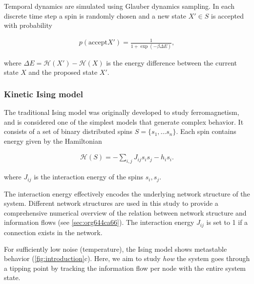 \documentclass[a4paper, 11pt, twocolumn]{article}
\begin{document}
Temporal  dynamics  are  simulated  using  Glauber  dynamics
sampling.  In each  discrete time  step a  spin is  randomly
chosen  and  a   new  state  \(X'\in  S\)   is  accepted  with
probability

\begin{equation}
\label{eq:glauber}
\begin{split}
 p(  \text{accept} X'  ) =  \frac{1}{1 +
\exp(-\beta   \Delta  E)},
\end{split}
\end{equation}

where  \(\Delta E  =  \mathcal{H}(X') -  \mathcal{H}(X)\) is  the
energy difference  between the  current state \(X\)  and the
proposed state \(X'\).

\subsubsection{Kinetic Ising model}
\label{sec:orgb324012}
The  traditional Ising  model  was  originally developed  to
study ferromagnetism, and is  considered one of the simplest
models that generate complex behavior.  It consists of a set
of binary distributed spins \(S = \{s_1, \dots s_n\}\). Each
spin contains energy given by the Hamiltonian

\begin{equation}
\label{eq:energy}
\begin{split}
\mathcal{H}(S) = -\sum_{i,j} J_{ij} s_{i} s_{j} - h_{i} s_{i}.
\end{split}
\end{equation}

where  \(J_{ij}\) is  the  interaction energy  of the  spins
\(s_i, s_j\).

The  interaction energy  effectively encodes  the underlying
network   structure  of   the   system.  Different   network
structures are used in this study to provide a comprehensive
numerical overview of the relation between network structure
and  information   flows  (see  \ref{sec:org644ca66}).  The
interaction energy  \(J_{ij}\) is set  to 1 if  a connection
exists in the network.

For sufficiently  low noise  (temperature), the  Ising model
shows   metastable  behavior   (\cref{fig:introduction}{c}).
Here,  we aim  to  study  \emph{how} the  system  goes through  a
tipping point by tracking the information flow per node with
the entire system state.
\end{document}
